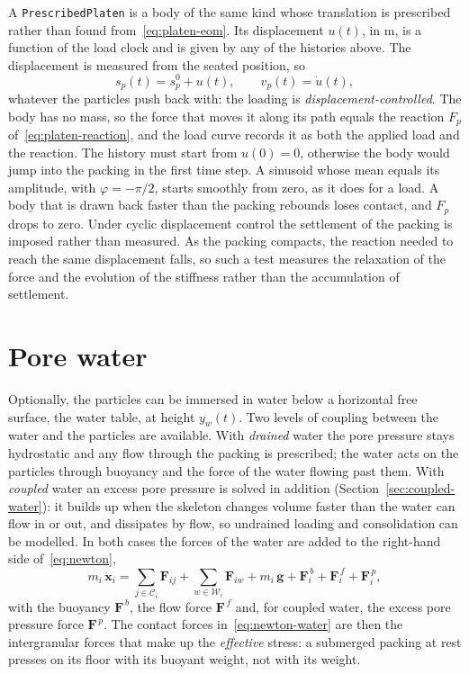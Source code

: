 A \texttt{PrescribedPlaten} is a body of the same kind whose translation is prescribed rather than found from~\eqref{eq:platen-eom}.
Its displacement $u(t)$, in \unit{\metre}, is a function of the load clock and is given by any of the histories above.
The displacement is measured from the seated position, so
\begin{equation}
  s_{p}(t) = s_{p}^{0} + u(t),
  \qquad
  v_{p}(t) = \dot u(t),
  \label{eq:prescribed-platen}
\end{equation}
whatever the particles push back with: the loading is \emph{displacement-controlled}.
The body has no mass, so the force that moves it along its path equals the reaction $F_{p}$ of~\eqref{eq:platen-reaction}, and the load curve records it as both the applied load and the reaction.
The history must start from $u(0)=0$, otherwise the body would jump into the packing in the first time step.
A sinusoid whose mean equals its amplitude, with $\varphi=-\pi/2$, starts smoothly from zero, as it does for a load.
A body that is drawn back faster than the packing rebounds loses contact, and $F_{p}$ drops to zero.
Under cyclic displacement control the settlement of the packing is imposed rather than measured.
As the packing compacts, the reaction needed to reach the same displacement falls, so such a test measures the relaxation of the force and the evolution of the stiffness rather than the accumulation of settlement.

\section{Pore water}
\label{sec:water}

Optionally, the particles can be immersed in water below a horizontal free
surface, the water table, at height $y_{w}(t)$.  Two levels of coupling between
the water and the particles are available.  With \emph{drained} water the pore
pressure stays hydrostatic and any flow through the packing is prescribed; the
water acts on the particles through buoyancy and the force of the water flowing
past them.  With \emph{coupled} water an excess pore pressure is solved in
addition (Section~\ref{sec:coupled-water}): it builds up when the skeleton
changes volume faster than the water can flow in or out, and dissipates by flow,
so undrained loading and consolidation can be modelled.  In both cases the
forces of the water are added to the right-hand side of~\eqref{eq:newton},
\begin{equation}
  m_{i}\,\ddot{\mathbf{x}}_{i}
    = \sum_{j\in\mathcal{C}_{i}} \mathbf{F}_{ij}
     + \sum_{w\in\mathcal{W}_{i}} \mathbf{F}_{iw}
     + m_{i}\,\mathbf{g}
     + \mathbf{F}_{i}^{\,b} + \mathbf{F}_{i}^{\,f} + \mathbf{F}_{i}^{\,p},
  \label{eq:newton-water}
\end{equation}
with the buoyancy $\mathbf{F}^{\,b}$, the flow force $\mathbf{F}^{\,f}$ and, for
coupled water, the excess pore pressure force $\mathbf{F}^{\,p}$.  The contact
forces in~\eqref{eq:newton-water} are then the intergranular forces that make up
the \emph{effective} stress: a submerged packing at rest presses on its floor
with its buoyant weight, not with its weight.

